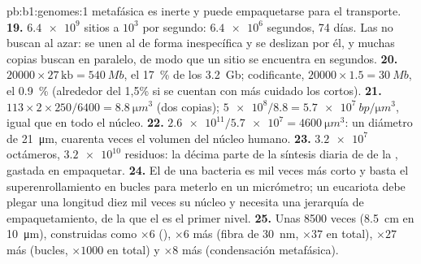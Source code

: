 \begin{solution}{pb:b1:genomes:1}
metafásica es inerte y puede empaquetarse para el transporte.
\textbf{19.} $\num{6.4e9}$ sitios a $10^3$ por segundo: $\num{6.4e6}$
segundos, 74 días. Las  no buscan al azar: se unen al  de forma
inespecífica y se deslizan por él, y muchas copias buscan en paralelo, de
modo que un sitio se encuentra en segundos.
\textbf{20.} $\num{20000}\times 27\,\mathrm{kb} = \qty{540}{Mb}$, el
\qty{17}{\%} de los \qty{3.2}{Gb}; codificante, $\num{20000}\times 1.5 =
\qty{30}{Mb}$, el \qty{0.9}{\%} (alrededor del 1,5\% si se cuentan con más
cuidado los  cortos).
\textbf{21.} $113\times 2\times 250/6400 = \qty{8.8}{\micro m^3}$ (dos
copias); $\num{5e8}/8.8 = \qty{5.7e7}{bp/\micro m^3}$, igual que en todo el
núcleo.
\textbf{22.} $\num{2.6e11}/\num{5.7e7} = \qty{4600}{\micro m^3}$: un
diámetro de \qty{21}{\micro m}, cuarenta veces el volumen del núcleo
humano.
\textbf{23.} $\num{3.2e7}$ octámeros, $\num{3.2e10}$ residuos: la décima
parte de la síntesis diaria de  de la , gastada en
empaquetar.
\textbf{24.} El  de una bacteria es mil veces más corto y basta el
superenrollamiento en bucles para meterlo en un micrómetro; un eucariota
debe plegar una longitud diez mil veces su núcleo y necesita una jerarquía
de empaquetamiento, de la que el  es el primer nivel.
\textbf{25.} Unas \num{8500} veces (\qty{8.5}{cm} en \qty{10}{\micro m}),
construidas como $\times 6$ (), $\times 6$ más (fibra de
\qty{30}{nm}, $\times 37$ en total), $\times 27$ más (bucles, $\times 1000$
en total) y $\times 8$ más (condensación metafásica).
\end{solution}
